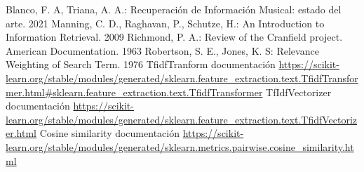 \begin{thebibliography}{4}
     Blanco, F. A, Triana, A. A.: Recuperación de Información Musical: estado del arte. 2021
     Manning, C. D., Raghavan, P., Schutze, H.: An Introduction to Information Retrieval. 2009
     Richmond, P. A.: Review of the Cranfield project. American Documentation. 1963
     Robertson, S. E., Jones, K. S: Relevance Weighting of Search Term. 1976
     TfidfTranform documentación \url{https://scikit-learn.org/stable/modules/generated/sklearn.feature_extraction.text.TfidfTransformer.html#sklearn.feature_extraction.text.TfidfTransformer}
     TfIdfVectorizer documentación \url{https://scikit-learn.org/stable/modules/generated/sklearn.feature_extraction.text.TfidfVectorizer.html}
     Cosine similarity documentación \url{https://scikit-learn.org/stable/modules/generated/sklearn.metrics.pairwise.cosine_similarity.html}
\end{thebibliography}